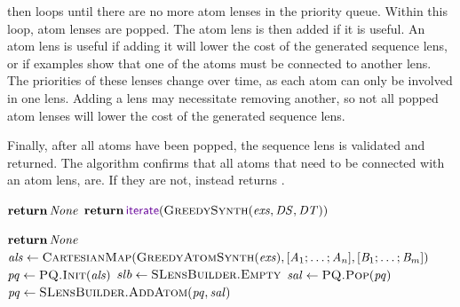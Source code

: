 \documentclass[acmsmall,screen,anonymous]{acmart}
\begin{document}
\GreedySeqSynth then loops until there are no more atom lenses in the priority
queue. Within this loop, atom lenses are popped. The atom lens is then added if
it is useful. An atom lens is useful if adding it will lower the cost of the
generated sequence lens, or if examples show that one of the atoms must be
connected to another lens. The priorities of these lenses change over time, as
each atom can only be involved in one lens. Adding a lens may necessitate
removing another, so not all popped atom lenses will lower the cost of the
generated sequence lens.

Finally, after all atoms have been popped, the sequence lens is validated and
returned. The algorithm confirms that all atoms that need to be connected with
an atom lens, are. If they are not,  instead returns
\None.

\begin{algorithm}
  \caption{\GreedySeqSynth}
  \label{alg:greedyseqsynth}
  \begin{algorithmic}[1]
    \State $\ReturnVal{\None}$
    \Else
    \State $\ReturnVal{\IterateLensOf{\GreedySynth(\Examples,\DNFRegex,\DNFRegexAlt)}}$
    \EndIf
    \EndFunction

    \State $\ReturnVal{\None}$
    \EndIf
    \State $\ALS \gets
    \Call{\CartesianMap}{\AtomSynth(\Examples),\ListOf{\Atom_1;\ldots;\Atom_n},\ListOf{\AtomAlt_1;\ldots;\AtomAlt_m}}$
    \State $\GreedyState \gets \Call{PQ.Init}{\ALS}$
    \State $slb \gets \Call{SLensBuilder.Empty}{}$
    \State $\SAtomLens \gets
    \Call{PQ.Pop}{\GreedyState}$
    \State $\GreedyState \gets \Call{SLensBuilder.AddAtom}{\GreedyState,\SAtomLens}$
    \EndIf
    \EndWhile
    \State {}
    \EndFunction
  \end{algorithmic}
\end{algorithm}
\end{document}
